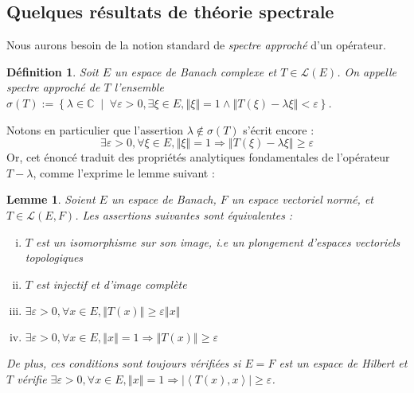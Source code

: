 \documentclass[a4paper,12pt]{article}
\newtheorem{definition}[theorem]{Définition}
\newtheorem{lemma}[theorem]{Lemme}
\newcommand{\C}{\mathbb{C}}
\newcommand{\norm}[1]{\left\Vert #1\right\Vert}
\newcommand{\abs}[1]{\left\vert#1\right\vert}
\newcommand{\ket}[1]{\left\langle #1 \right\rangle}
\newcommand{\set}[1]{\left\{ #1 \right\}}
\newcommand{\tq}{\;\middle|\;}
\renewcommand{\implies}{\Rightarrow}
\newcommand{\TODO}[1]{}%
\begin{document}
\TODO{commentaires}

\subsection{Quelques résultats de théorie spectrale}

Nous aurons besoin de la notion standard de \emph{spectre approché} d'un opérateur.

\begin{definition}
    Soit $E$ un espace de Banach complexe et $T\in\mathcal{L}(E)$. 
    On appelle \emph{spectre approché de $T$} l'ensemble $\sigma(T) := \set{\lambda\in\C\tq\forall\varepsilon>0, \exists\xi\in E, \norm{\xi}=1\land\norm{T(\xi)-\lambda\xi}<\varepsilon}$.
\end{definition}

Notons en particulier que l'assertion $\lambda\notin\sigma(T)$ s'écrit encore :
\begin{equation*}
    \exists\varepsilon>0, \forall\xi\in E, \norm{\xi}=1\implies \norm{T(\xi)-\lambda\xi}\geq\varepsilon
\end{equation*}
Or, cet énoncé traduit des propriétés analytiques fondamentales de l'opérateur $T - \lambda$, comme l'exprime le lemme suivant :

\begin{lemma}\label{EVT_emb_TFAE}
    Soient $E$ un espace de Banach, $F$ un espace vectoriel normé, et $T\in\mathcal{L}(E, F)$. Les assertions suivantes sont équivalentes :
    \begin{enumerate}[(i)]
        \item $T$ est un isomorphisme sur son image, i.e un plongement d'espaces vectoriels topologiques \label{EVT_emb_TFAE/emb}
        \item $T$ est injectif et d'image complète \label{EVT_emb_TFAE/closed_range_inj}
        \item $\exists\varepsilon>0, \forall x\in E, \norm{T(x)}\geq\varepsilon\norm{x}$ \label{EVT_emb_TFAE/lower_bound_norm}
        \item $\exists\varepsilon>0, \forall x\in E, \norm{x} = 1 \implies \norm{T(x)}\geq\varepsilon$ \label{EVT_emb_TFAE/lower_bound_norm'}
    \end{enumerate}
    De plus, ces conditions sont toujours vérifiées si $E=F$ est un espace de Hilbert et $T$ vérifie $\exists\varepsilon>0, \forall x\in E, \norm{x} = 1 \implies \abs{\ket{T(x), x}}\ge\varepsilon$.
\end{lemma}
\end{document}
